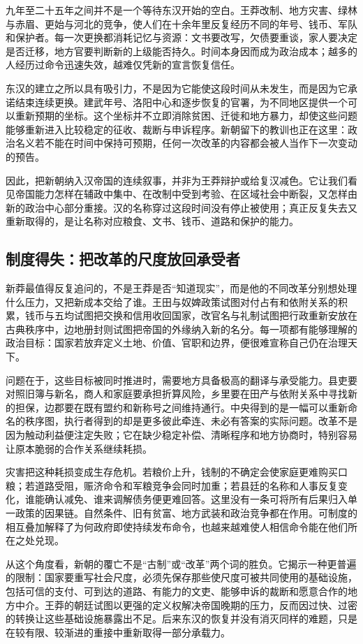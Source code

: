 九年至二十五年之间并不是一个等待东汉开始的空白。王莽改制、地方灾害、绿林与赤眉、更始与河北的竞争，使人们在十余年里反复经历不同的年号、钱币、军队和保护者。每一次更换都消耗记忆与资源：文书要改写，欠债要重谈，家人要决定是否迁移，地方官要判断新的上级能否持久。时间本身因而成为政治成本；越多的人经历过命令迅速失效，越难仅凭新的宣言恢复信任。

东汉的建立之所以具有吸引力，不是因为它能使这段时间从未发生，而是因为它承诺结束连续更换。建武年号、洛阳中心和逐步恢复的官署，为不同地区提供一个可以重新预期的坐标。这个坐标并不立即消除贫困、迁徙和地方暴力，却使这些问题能够重新进入比较稳定的征收、裁断与申诉程序。新朝留下的教训也正在这里：政治名义若不能在时间中保持可预期，任何一次改革的内容都会被人当作下一次变动的预告。

因此，把新朝纳入汉帝国的连续叙事，并非为王莽辩护或给复汉减色。它让我们看见帝国能力怎样在辅政中集中、在改制中受到考验、在区域社会中断裂，又怎样由新的政治中心部分重接。汉的名称穿过这段时间没有停止被使用；真正反复失去又重新取得的，是让名称对应粮食、文书、钱币、道路和保护的能力。

\subsection{制度得失：把改革的尺度放回承受者}

新莽最值得反复追问的，不是王莽是否“知道现实”，而是他的不同改革分别想处理什么压力，又把新成本交给了谁。王田与奴婢政策试图对付占有和依附关系的积累，钱币与五均试图把交换和信用收回国家，改官名与礼制试图把行政重新安放在古典秩序中，边地册封则试图把帝国的外缘纳入新的名分。每一项都有能够理解的政治目标：国家若放弃定义土地、价值、官职和边界，便很难宣称自己仍在治理天下。

问题在于，这些目标被同时推进时，需要地方具备极高的翻译与承受能力。县吏要对照旧簿与新名，商人和家庭要承担折算风险，乡里要在田产与依附关系中寻找新的担保，边郡要在既有盟约和新称号之间维持通行。中央得到的是一幅可以重新命名的秩序图，执行者得到的却是更多彼此牵连、未必有答案的实际问题。改革不是因为触动利益便注定失败；它在缺少稳定补偿、清晰程序和地方协商时，特别容易让原本脆弱的合作关系继续耗损。

灾害把这种耗损变成生存危机。若粮价上升，钱制的不确定会使家庭更难购买口粮；若道路受阻，赈济命令和军粮竞争会同时加重；若县廷的名称和人事反复变化，谁能确认减免、谁来调解债务便更难回答。这里没有一条可将所有后果归入单一政策的因果链。自然条件、旧有贫富、地方武装和政治竞争都在作用。可制度的相互叠加解释了为何政府即使持续发布命令，也越来越难使人相信命令能在他们所在之处兑现。

从这个角度看，新朝的覆亡不是“古制”或“改革”两个词的胜负。它揭示一种更普遍的限制：国家要重写社会尺度，必须先保存那些使尺度可被共同使用的基础设施，包括可信的支付、可到达的道路、有能力的文吏、能够申诉的裁断和愿意合作的地方中介。王莽的朝廷试图以更强的定义权解决帝国晚期的压力，反而因过快、过密的转换让这些基础设施暴露出不足。后来东汉的恢复并没有消灭同样的难题，只是在较有限、较渐进的重接中重新取得一部分承载力。

